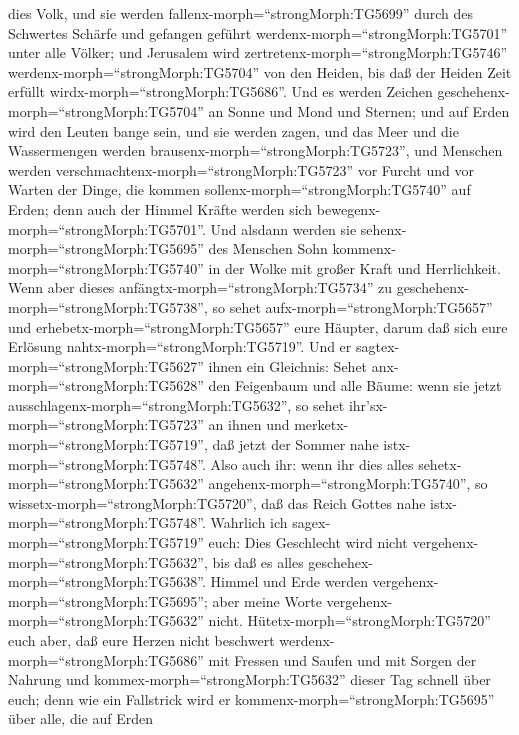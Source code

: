 dies Volk,  und sie werden
fallenx-morph=``strongMorph:TG5699'' durch des Schwertes Schärfe und
gefangen geführt werdenx-morph=``strongMorph:TG5701'' unter alle Völker;
und Jerusalem wird zertretenx-morph=``strongMorph:TG5746''
werdenx-morph=``strongMorph:TG5704'' von den Heiden, bis daß der Heiden
Zeit erfüllt wirdx-morph=``strongMorph:TG5686''.  Und es
werden Zeichen geschehenx-morph=``strongMorph:TG5704'' an Sonne und Mond
und Sternen; und auf Erden wird den Leuten bange sein, und sie werden
zagen, und das Meer und die Wassermengen werden
brausenx-morph=``strongMorph:TG5723'',  und Menschen werden
verschmachtenx-morph=``strongMorph:TG5723'' vor Furcht und vor Warten
der Dinge, die kommen sollenx-morph=``strongMorph:TG5740'' auf Erden;
denn auch der Himmel Kräfte werden sich
bewegenx-morph=``strongMorph:TG5701''.  Und alsdann werden
sie sehenx-morph=``strongMorph:TG5695'' des Menschen Sohn
kommenx-morph=``strongMorph:TG5740'' in der Wolke mit großer Kraft und
Herrlichkeit.  Wenn aber dieses
anfängtx-morph=``strongMorph:TG5734'' zu
geschehenx-morph=``strongMorph:TG5738'', so sehet
aufx-morph=``strongMorph:TG5657'' und
erhebetx-morph=``strongMorph:TG5657'' eure Häupter, darum daß sich eure
Erlösung nahtx-morph=``strongMorph:TG5719''.  Und er
sagtex-morph=``strongMorph:TG5627'' ihnen ein Gleichnis: Sehet
anx-morph=``strongMorph:TG5628'' den Feigenbaum und alle Bäume:
 wenn sie jetzt ausschlagenx-morph=``strongMorph:TG5632'',
so sehet ihr'sx-morph=``strongMorph:TG5723'' an ihnen und
merketx-morph=``strongMorph:TG5719'', daß jetzt der Sommer nahe
istx-morph=``strongMorph:TG5748''.  Also auch ihr: wenn ihr
dies alles sehetx-morph=``strongMorph:TG5632''
angehenx-morph=``strongMorph:TG5740'', so
wissetx-morph=``strongMorph:TG5720'', daß das Reich Gottes nahe
istx-morph=``strongMorph:TG5748''.  Wahrlich ich
sagex-morph=``strongMorph:TG5719'' euch: Dies Geschlecht wird nicht
vergehenx-morph=``strongMorph:TG5632'', bis daß es alles
geschehex-morph=``strongMorph:TG5638''.  Himmel und Erde
werden vergehenx-morph=``strongMorph:TG5695''; aber meine Worte
vergehenx-morph=``strongMorph:TG5632'' nicht. 
Hütetx-morph=``strongMorph:TG5720'' euch aber, daß eure Herzen nicht
beschwert werdenx-morph=``strongMorph:TG5686'' mit Fressen und Saufen
und mit Sorgen der Nahrung und kommex-morph=``strongMorph:TG5632''
dieser Tag schnell über euch;  denn wie ein Fallstrick wird
er kommenx-morph=``strongMorph:TG5695'' über alle, die auf Erden
